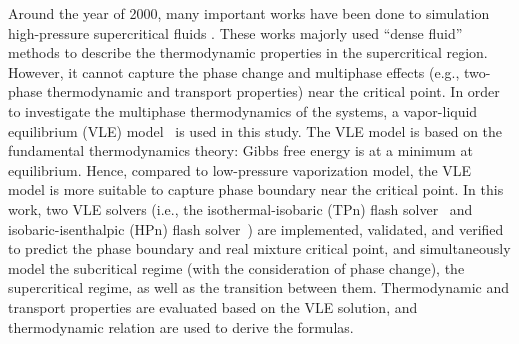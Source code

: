 
Around the year of 2000, many important works have been done to simulation high-pressure supercritical fluids \cite{oefelein2005thermophysical,bellan2000supercritical,yang2000modeling}. These works majorly used ``dense fluid'' methods to describe the thermodynamic properties in the supercritical region. However, it cannot capture the phase change and multiphase effects (e.g., two-phase thermodynamic and transport properties) near the critical point.
In order to investigate the multiphase thermodynamics of the  systems, a vapor-liquid equilibrium (VLE) model~\cite{michelsen1982isothermal,michelsen1987multiphase} is used in this study. The VLE model is based on the fundamental thermodynamics theory: Gibbs free energy is at a minimum at equilibrium. Hence, compared to low-pressure vaporization model, the VLE model is more suitable to capture phase boundary near the critical point. In this work, two VLE solvers (i.e., the isothermal-isobaric (TPn) flash solver~\cite{michelsen1982isothermal} and isobaric-isenthalpic (HPn) flash solver~\cite{michelsen1987multiphase}) are implemented, validated, and verified to predict the phase boundary and real mixture critical point, and simultaneously model the subcritical regime (with the consideration of phase change), the supercritical regime, as well as the transition between them. Thermodynamic and transport properties are evaluated based on the VLE solution, and thermodynamic relation are used to derive the formulas. %

